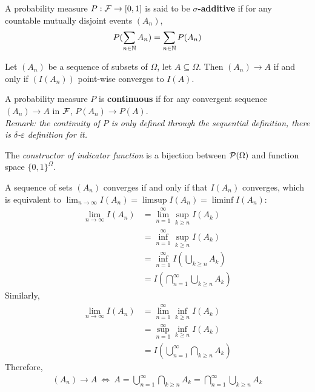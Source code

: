 \documentclass{article}
\begin{document}
   	\begin{definition}
   		A probability measure $P: \mathcal{{F}} \to [0, 1]$ is said to be \textbf{$\sigma$-additive} if for any countable mutually disjoint events $(A_n)$,
   		\begin{align}
   			P(\sum_{n \in \mathbb{N}} A_n) = \sum_{n \in \mathbb{N}} P(A_n)
   		\end{align}
   	\end{definition}
   	
   	\begin{definition}
   		Let $(A_n)$ be a sequence of subsets of $\Omega$, let $A \subseteq \Omega$. Then $(A_n) \to A$ if and only if $(I(A_n))$ point-wise converges to $I(A)$.
   	\end{definition}
   	
   	\begin{definition}
   		A probability measure $P$ is \textbf{continuous} if for any convergent sequence $(A_n) \to A$ in $\mathcal{{F}}$, $P(A_n) \to P(A)$. \\
   		\emph{Remark: the continuity of $P$ is only defined through the sequential definition, there is $\delta$-$\varepsilon$ definition for it.}
   	\end{definition}
   	
   	\begin{remark}
   		The \emph{constructor of indicator function} is a bijection between $\mathcal{{P}}(\Omega)$ and function space $\{0, 1\}^\Omega$.
   	\end{remark}
   	
   	\begin{proposition}
   		A sequence of sets $(A_n)$ converges if and only if that $I(A_n)$ converges, which is equivalent to $\lim_{n \to \infty} I(A_n) = \limsup I(A_n) = \liminf I(A_n)$:
   		\begin{align}
   			\lim_{n \to \infty} I(A_n) &= \lim_{n=1}^\infty \sup_{k\geq n} I(A_k) \\
   			&=\inf_{n=1}^\infty \sup_{k\geq n} I(A_k) \\
   			&=\inf_{n=1}^\infty I(\bigcup_{k \geq n} A_k) \\
   			&=I(\bigcap_{n=1}^\infty \bigcup_{k \geq n} A_k)
   		\end{align}
   		Similarly,
   		\begin{align}
   			\lim_{n \to \infty} I(A_n) &= \lim_{n=1}^\infty \inf_{k\geq n} I(A_k) \\
   			&= \sup_{n=1}^\infty \inf_{k\geq n} I(A_k) \\
   			&= I(\bigcup_{n=1}^\infty \bigcap_{k \geq n} A_k)
   		\end{align}
   		Therefore, 
   		\begin{align}
   			(A_n) \to A\ \iff\ A = \bigcup_{n=1}^\infty \bigcap_{k \geq n} A_k = \bigcap_{n=1}^\infty \bigcup_{k \geq n} A_k
   		\end{align}
   	\end{proposition}
   	
\end{document}
